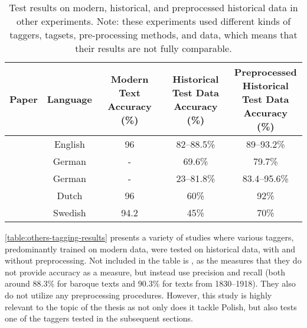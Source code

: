 \begin{table*}[h]
\begin{center}
\begin{tabular}{|l|cccc|}
\hline \bf Paper & \bf Language & \bf \makecell[c]{Modern Text \\ Accuracy (\%)} & \bf \makecell[c]{Historical \\ Test Data \\ Accuracy (\%)} & \bf \makecell[c]{Preprocessed \\ Historical \\ Test Data \\ Accuracy (\%)} \\ \hline
\citet{rayson07} & English & 96 & 82--88.5\% & 89--93.2\% \\
\citet{scheible11} & German & - & 69.6\% & 79.7\% \\
\citet{bollmann-2013-pos} & German & - & 23--81.8\% & 83.4--95.6\% \\
\citet{hupkes16} & Dutch & 96 & 60\% & 92\% \\
\citet{adesam-bouma-2016-old} & Swedish & 94.2\footnotemark & 45\% & 70\% \\
\hline
\end{tabular}
\end{center}
\caption{\label{table:others-tagging-results} Test results on modern, historical, and preprocessed historical data in other experiments. Note: these experiments used different kinds of taggers, tagsets, pre-processing methods, and data, which means that their results are not fully comparable.}
\end{table*}

\autoref{table:others-tagging-results} presents a variety of studies where various taggers, predominantly trained on modern data, were tested on historical data, with and without preprocessing. Not included in the table is \citet{waszczuk2018morphosyntactic}, as the measures that they do not provide accuracy as a measure, but instead use precision and recall (both around 88.3\% for baroque texts and 90.3\% for texts from 1830--1918). They also do not utilize any preprocessing procedures. However, this study is highly relevant to the topic of the thesis as not only does it tackle Polish, but also tests one of the taggers tested in the subsequent sections. 

